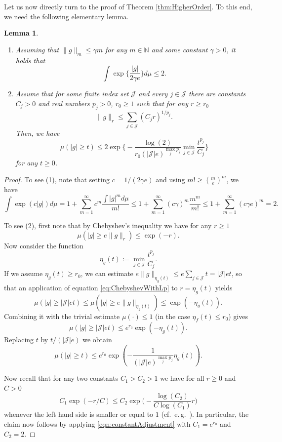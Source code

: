 \documentclass[a4paper,12pt]{amsart}
\numberwithin{equation}{section}
\newtheorem{lemma}[satz]{Lemma}
\theoremstyle{remark}
\def\N{{\mathbb N}}
\begin{document}
Let us now directly turn to the proof of Theorem \ref{thm:HigherOrder}. To this end, we need the following elementary lemma.

\begin{lemma}\label{lem:Conc}
	\begin{enumerate}
		\item Assuming that $\lVert g \rVert_m \le \gamma m$ for any $m \in \N$ and some constant $\gamma > 0$, it holds that
		\[
		\int \exp\Big\{ \frac{|g|}{2\gamma e}\Big\} d\mu \le 2.
		\]
		\item Assume that for some finite index set $\mathcal{J}$ and every $j \in \mathcal{J}$ there are constants $C_j > 0$ and real numbers $p_j > 0$, $r_0 \ge 1$ such that for any $r \ge r_0$
		\[
		\lVert g \rVert_r \le \sum_{j \in \mathcal{J}} (C_j r)^{1/p_j}.
		\]
		Then, we have
		\[
		\mu(|g| \ge t) \le 2 \exp\Big\{-\frac{\log(2)}{r_0(|\mathcal{J}|e)^{\max_j p_j}} \min_{j \in \mathcal{J}} \frac{t^{p_j}}{C_j}\Big\}
		\]
		for any $t \ge 0$.
	\end{enumerate}
\end{lemma}

\begin{proof}
	To see (1), note that  setting $c = 1/(2 \gamma e)$ and using $m! \ge (\frac{m}{e})^m$, we have
	\[
	\int \exp(c|g|) d\mu = 1 + \sum_{m=1}^{\infty} c^m \frac{\int |g|^m d\mu}{m!} 
	\le 1 + \sum_{m=1}^{\infty} (c \gamma)^m \frac{m^m}{m!}
	\le 1 + \sum_{m=1}^{\infty} (c \gamma e)^m = 2.
	\]
	
	To see (2), first note that by Chebyshev's inequality we have for any $r \ge 1$
	\begin{equation}  \label{eq:ChebyshevWithLp}
		\mu (|g| \ge e \lVert g \rVert_r) \le \exp(-r).
	\end{equation}
	Now consider the function
	\[
	\eta_g(t) := \min_{j\in\mathcal{J}} \frac{t^{p_j}}{C_j}.
	\]
	If we assume $\eta_g(t) \ge r_0$, we can estimate $e \lVert g \rVert_{\eta_g(t)} \le e \sum_{j \in \mathcal{J}} t = |\mathcal{J}|et$, so that an application of equation \eqref{eq:ChebyshevWithLp} to $r = \eta_g(t)$ yields
	\[
	\mu(|g| \ge |\mathcal{J}|et) \le \mu(|g| \ge e\lVert g \rVert_{\eta_g(t)}) \le \exp\left( - \eta_g(t) \right).
	\]
	Combining it with the trivial estimate $\mu(\cdot) \le 1$ (in the case $\eta_f(t) \le r_0$) gives
	\[
	\mu(|g| \ge |\mathcal{J}|et) \le e^{r_0} \exp(-\eta_g(t)).
	\]
	Replacing $t$ by $t/(|\mathcal{J}|e)$ we obtain
	\[
	\mu(|g| \ge t) \le e^{r_0} \exp \left( - \frac{1}{(|\mathcal{J}|e)^{\max_jp_j}} \eta_g(t) \right).
	\]
	
	Now recall that for any two constants $C_1 > C_2 > 1$ we have for all $r \ge 0$ and $C > 0$
	\begin{equation}\label{eqn:constantAdjustment} 
	C_1 \exp(-r/C) \le C_2 \exp\Big(-\frac{\log(C_2)}{C\log(C_1)} r\Big)
	\end{equation}
	whenever the left hand side is smaller or equal to $1$ (cf.\ e.\,g.\ \cite[Eq.\ (3.1)]{SS21}). In particular, the claim now follows by applying \eqref{eqn:constantAdjustment} with $C_1 = e^{r_0}$ and $C_2 = 2$.
\end{proof}
\end{document}
